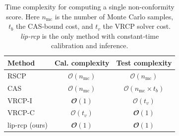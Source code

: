 \begin{table}[h]
  \centering
  \begin{tabular}{lcc}
    \toprule
    Method         & Cal. complexity & Test complexity \\
    \midrule
    RSCP           & \(\mathcal{O}(n_{\mathrm{mc}})\)              & \(\mathcal{O}(n_{\mathrm{mc}})\)               \\
    CAS            & \(\mathcal{O}(n_{\mathrm{mc}})\)              & \(\mathcal{O}(n_{\mathrm{mc}}\times t_b)\)     \\
    VRCP-I         & \(\mathbfcal{O}(1)\)                             & \(\mathcal{O}(t_v)\)                            \\
    VRCP-C         & \(\mathcal{O}(t_v)\)                           & \(\mathbfcal{O}(1)\)                             \\
    lip-rcp (ours) & \(\mathbfcal{O}(1)\)                             & \(\mathbfcal{O}(1)\)                             \\
    \bottomrule
  \end{tabular}
  \caption{Time complexity for computing a single non-conformity score. Here \(n_{\mathrm{mc}}\) is the number of Monte Carlo samples, \(t_b\) the CAS‐bound cost, and \(t_v\) the VRCP solver cost. \emph{lip-rcp} is the only method with constant‐time calibration and inference.}
  \label{tab:time_complexities}
\end{table}
